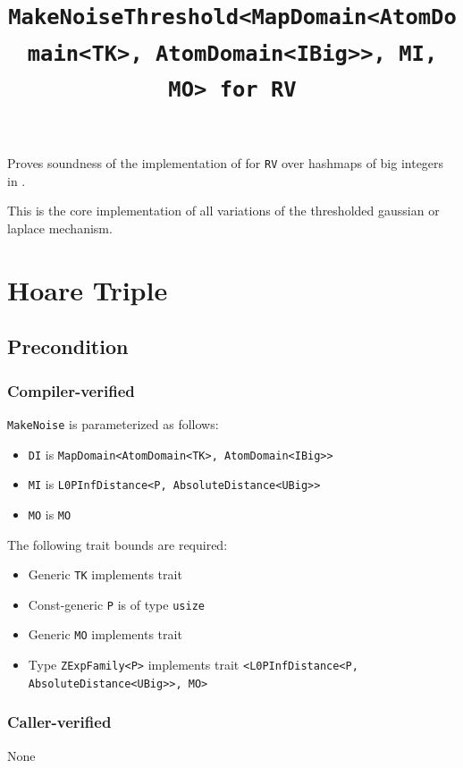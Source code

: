 \documentclass{article}
\title{\texttt{MakeNoiseThreshold<MapDomain<AtomDomain<TK>, AtomDomain<IBig>{}>, MI, MO> for RV}}
\author{\MichaelShoemateAuthor}
\date{}
\begin{document}
\maketitle

\contrib
Proves soundness of the implementation of  
for \texttt{RV} over hashmaps of big integers in .

This is the core implementation of all variations of the thresholded gaussian or laplace mechanism.

\section{Hoare Triple}
\subsection*{Precondition}
\subsubsection*{Compiler-verified}
\texttt{MakeNoise} is parameterized as follows:
\begin{itemize}
    \item \texttt{DI} is \texttt{MapDomain<AtomDomain<TK>, AtomDomain<IBig>{}>}
    \item \texttt{MI} is \texttt{L0PInfDistance<P, AbsoluteDistance<UBig>{}>}
    \item \texttt{MO} is \texttt{MO}
\end{itemize}

The following trait bounds are required:
\begin{itemize}
    \item Generic \texttt{TK} implements trait 
    \item Const-generic \texttt{P} is of type \texttt{usize}
    \item Generic \texttt{MO} implements trait 
    \item Type \texttt{ZExpFamily<P>} implements trait \texttt{<L0PInfDistance<P, AbsoluteDistance<UBig>{}>, MO>}
\end{itemize}

\subsubsection*{Caller-verified}
None
\end{document}
